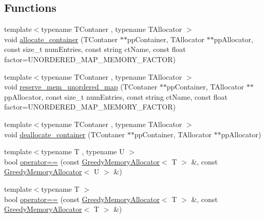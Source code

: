 \subsection*{Functions}
\begin{DoxyCompactItemize}
\item 
{\footnotesize template$<$typename T\+Contaner , typename T\+Allocator $>$ }\\void \hyperlink{namespaceuva_1_1utils_1_1containers_1_1alloc_ae65da467dfcf6c2ee5cc8dd2be1ca469}{allocate\+\_\+container} (T\+Contaner $\ast$$\ast$pp\+Container, T\+Allocator $\ast$$\ast$pp\+Allocator, const size\+\_\+t num\+Entries, const string ct\+Name, const float factor=U\+N\+O\+R\+D\+E\+R\+E\+D\+\_\+\+M\+A\+P\+\_\+\+M\+E\+M\+O\+R\+Y\+\_\+\+F\+A\+C\+T\+O\+R)
\item 
{\footnotesize template$<$typename T\+Contaner , typename T\+Allocator $>$ }\\void \hyperlink{namespaceuva_1_1utils_1_1containers_1_1alloc_a59048810604739dc323f29e6a80d88e6}{reserve\+\_\+mem\+\_\+unordered\+\_\+map} (T\+Contaner $\ast$$\ast$pp\+Container, T\+Allocator $\ast$$\ast$pp\+Allocator, const size\+\_\+t num\+Entries, const string ct\+Name, const float factor=U\+N\+O\+R\+D\+E\+R\+E\+D\+\_\+\+M\+A\+P\+\_\+\+M\+E\+M\+O\+R\+Y\+\_\+\+F\+A\+C\+T\+O\+R)
\item 
{\footnotesize template$<$typename T\+Contaner , typename T\+Allocator $>$ }\\void \hyperlink{namespaceuva_1_1utils_1_1containers_1_1alloc_a3da269005cf5338d84a04ea0ac42f673}{deallocate\+\_\+container} (T\+Contaner $\ast$$\ast$pp\+Container, T\+Allocator $\ast$$\ast$pp\+Allocator)
\item 
{\footnotesize template$<$typename T , typename U $>$ }\\bool \hyperlink{namespaceuva_1_1utils_1_1containers_1_1alloc_a92b72abcecaa07710c8ff118c4ac9da9}{operator==} (const \hyperlink{classuva_1_1utils_1_1containers_1_1alloc_1_1_greedy_memory_allocator}{Greedy\+Memory\+Allocator}$<$ T $>$ \&, const \hyperlink{classuva_1_1utils_1_1containers_1_1alloc_1_1_greedy_memory_allocator}{Greedy\+Memory\+Allocator}$<$ U $>$ \&)
\item 
{\footnotesize template$<$typename T $>$ }\\bool \hyperlink{namespaceuva_1_1utils_1_1containers_1_1alloc_a07a80d381a8408c38031f57dd2357a81}{operator==} (const \hyperlink{classuva_1_1utils_1_1containers_1_1alloc_1_1_greedy_memory_allocator}{Greedy\+Memory\+Allocator}$<$ T $>$ \&, const \hyperlink{classuva_1_1utils_1_1containers_1_1alloc_1_1_greedy_memory_allocator}{Greedy\+Memory\+Allocator}$<$ T $>$ \&)

\end{DoxyCompactItemize}
